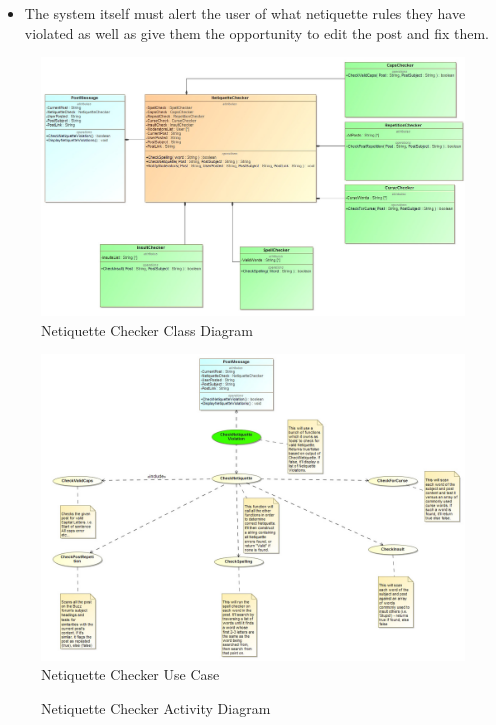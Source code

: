 \documentclass[11pt]{article}
\begin{document}
\begin{enumerate}
\begin{itemize}
\begin{itemize}
	  		\item The system itself must alert the user of what netiquette rules they have violated as well as give them the opportunity to edit the post and fix them.
	  	\end{itemize}
	  		\begin{figure}[H]
	  			\caption{Netiquette Checker Class Diagram}
	  			\includegraphics[scale=0.35]{NetInputOutput.jpg}
	  		\end{figure}
	  		\begin{figure}[H]
	  			\caption{Netiquette Checker Use Case}
	  			\includegraphics[scale=0.35]{NetUseCase.jpg}
	  		\end{figure}
	  		\begin{figure}[H]
	  			\caption{Netiquette Checker Activity Diagram}

\end{figure}
\end{itemize}
\end{enumerate}
\end{document}
